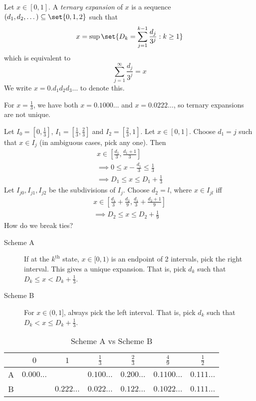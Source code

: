
\begin{definition} \label{def:ternary_expansion}
    Let $x \in [0, 1]$.
    A \emph{ternary expansion} of $x$ is a sequence $(d_1, d_2, \dots)
    \subseteq \set{0, 1, 2}$ such that \[
        x = \sup \set{D_k = \sum_{j=1}^{k-1} \frac{d_j}{3^j} : k \ge 1}
    \] which is equivalent to \[
        \sum_{j=1}^{\infty} \frac{d_j}{3^j} = x
    \] We write $x = 0.d_1d_2d_3\dots$ to denote this.
\end{definition}
\begin{example}
    For $x = \frac13$, we have both $x = 0.1000\dots$ and
    $x = 0.0222\dots$, so ternary expansions are not unique.
\end{example}

Let $I_0 = [0, \frac13]$, $I_1 = [\frac13, \frac23]$ and
$I_2 = [\frac23, 1]$.
Let $x \in [0, 1]$.
Choose $d_1 = j$ such that $x \in I_j$ (in ambiguous cases,
pick any one).
Then \begin{align*}
    x \in \left[\frac{d_1}{3}, \frac{d_1 + 1}{3}\right] \\
    \implies 0 \le x - \frac{d_1}{3} \le \frac13 \\
    \implies D_1 \le x \le D_1 + \frac13
\end{align*}
Let $I_{j 0}, I_{j 1}, I_{j 2}$ be the subdivisions of $I_j$.
Choose $d_2 = l$, where $x \in I_{jl}$ iff \begin{align*}
    x \in \left[\frac{d_1}{3} + \frac{d_2}{9},
        \frac{d_1}{3} + \frac{d_2 + 1}{9}\right] \\
    \implies D_2 \le x \le D_2 + \frac19
\end{align*}
How do we break ties?
\begin{description}
    \item[Scheme A] If at the $k^{\text{th}}$ state, $x \in [0, 1)$ is
    an endpoint of 2 intervals, pick the right interval.
    This gives a unique expansion.
    That is, pick $d_k$ such that $D_k \le x < D_k + \frac13$.
    \item[Scheme B] For $x \in (0, 1]$, always pick the left interval.
    That is, pick $d_k$ such that $D_k < x \le D_k + \frac13$.
\end{description}
\begin{table}
    \centering
    \begin{tabular}{c|c|c|c|c|c|c}
        \toprule
        & $0$ & $1$ & $\frac13$ & $\frac23$ & $\frac49$ & $\frac12$ \\
        \midrule
        A & $0.000\dots$ & & $0.100\dots$ & $0.200\dots$ &
            $0.1100\dots$ & $0.111\dots$ \\
        B & & $0.222\dots$ & $0.022\dots$ & $0.122\dots$ &
            $0.1022\dots$ & $0.111\dots$ \\
        \bottomrule
    \end{tabular}
    \caption{Scheme A vs Scheme B}
    \label{tab:ternary_expansion}
\end{table}
